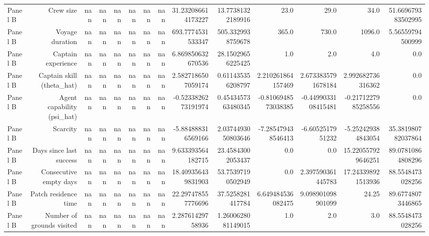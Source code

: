 \documentclass{article}
\begin{document}
\begin{tabular}{lrrrrrrrrrrrrr}
Panel B & Crew size & nan & nan & nan & nan & nan & nan & 31.232086614173227 & 13.77381322189916 & 23.0 & 29.0 & 34.0 & 51.669679383502995 \\
Panel B & Voyage duration & nan & nan & nan & nan & nan & nan & 693.7774531533347 & 505.3329938759678 & 365.0 & 730.0 & 1096.0 & 5.56559794500999 \\
Panel B & Captain experience & nan & nan & nan & nan & nan & nan & 6.869850632670536 & 28.15029656225425 & 1.0 & 2.0 & 4.0 & 0.0 \\
Panel B & Captain skill (theta\_hat) & nan & nan & nan & nan & nan & nan & 2.5827186507059174 & 0.611435356208797 & 2.210261864157469 & 2.6733835791678184 & 2.992682736316362 & 0.0 \\
Panel B & Agent capability (psi\_hat) & nan & nan & nan & nan & nan & nan & -0.5233826273191974 & 0.4543457363480345 & -0.8106948573038385 & -0.4499033108415481 & -0.2171227985258556 & 0.0 \\
Panel B & Scarcity & nan & nan & nan & nan & nan & nan & -5.884888316569166 & 2.0374493050803646 & -7.285479438546413 & -6.6052517951232 & -5.252429384843054 & 35.381980782037864 \\
Panel B & Days since last success & nan & nan & nan & nan & nan & nan & 9.633393564182715 & 23.45843002053437 & 0.0 & 0.0 & 15.220557929646251 & 89.07810864808296 \\
Panel B & Consecutive empty days & nan & nan & nan & nan & nan & nan & 18.409356439831903 & 53.75397190502949 & 0.0 & 2.397590361445783 & 17.243398921513936 & 88.5548473028256 \\
Panel B & Patch residence time & nan & nan & nan & nan & nan & nan & 22.297478557776696 & 37.5258281417784 & 6.649484536082475 & 9.098901098901099 & 24.25 & 89.67748073446865 \\
Panel B & Number of grounds visited & nan & nan & nan & nan & nan & nan & 2.28761429758936 & 1.2600628081149015 & 1.0 & 2.0 & 3.0 & 88.5548473028256 \\
\hline
\end{tabular}
\end{document}
